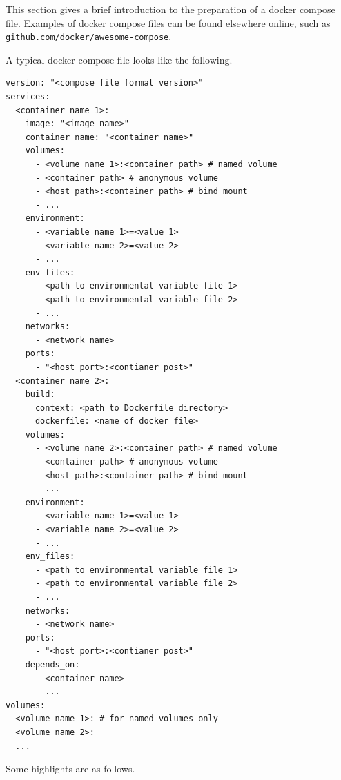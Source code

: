 This section gives a brief introduction to the preparation of a docker compose file. Examples of docker compose files can be found elsewhere online, such as \texttt{github.com/docker/awesome-compose}. 

A typical docker compose file looks like the following.

\begin{lstlisting}
version: "<compose file format version>"
services:
  <container name 1>:
    image: "<image name>"
    container_name: "<container name>"
    volumes:
      - <volume name 1>:<container path> # named volume
      - <container path> # anonymous volume
      - <host path>:<container path> # bind mount
      - ...
    environment:
      - <variable name 1>=<value 1>
      - <variable name 2>=<value 2>
      - ...
    env_files:
      - <path to environmental variable file 1>
      - <path to environmental variable file 2>
      - ...
    networks:
      - <network name>
    ports:
      - "<host port>:<contianer post>"
  <container name 2>:
    build:
      context: <path to Dockerfile directory>
      dockerfile: <name of docker file>
    volumes:
      - <volume name 2>:<container path> # named volume
      - <container path> # anonymous volume
      - <host path>:<container path> # bind mount
      - ...
    environment:
      - <variable name 1>=<value 1>
      - <variable name 2>=<value 2>
      - ...
    env_files:
      - <path to environmental variable file 1>
      - <path to environmental variable file 2>
      - ...
    networks:
      - <network name>
    ports:
      - "<host port>:<contianer post>"
    depends_on:
      - <container name>
      - ...
volumes:
  <volume name 1>: # for named volumes only
  <volume name 2>:
  ...
\end{lstlisting}
Some highlights are as follows.
